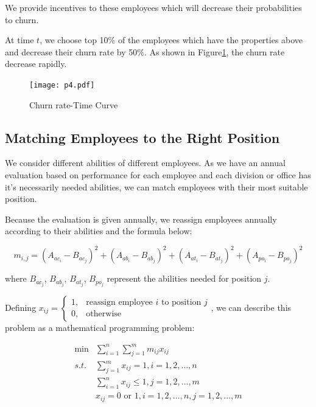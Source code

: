 \documentclass[12pt,a4paper,titlepage]{article}
\begin{document}
We provide incentives to these employees which will decrease their
probabilities to churn.

At time $t$, we choose top 10\% of the employees which have the
properties above and decrease their churn rate by 50\%. As shown in
Figure\ref{churn-rate}, the churn rate decrease rapidly.

\begin{figure}[htb]
  \centering
  \texttt{[image: p4.pdf]}
  \caption{Churn rate-Time Curve}
  \label{churn-rate}
\end{figure}

\subsection{Matching Employees to the Right Position}
\label{sec:matching-employees-to-the-right-position}

We consider different abilities of different employees. As we have an
annual evaluation based on performance for each employee and each
division or office has it's necessarily needed abilities, we can match
employees with their most suitable position.

Because the evaluation is given annually, we reassign employees
annually according to their abilities and the formula below:

\begin{equation}
m_{i,j} =
{(A_{ac_i}-B_{ac_j})}^2 + {(A_{ab_i}-B_{ab_j})}^2 + {(A_{at_i}-B_{at_j})}^2
+ {(A_{po_i}-B_{po_j})}^2
\end{equation}

where $B_{ac_j}$, $B_{ab_j}$, $B_{at_j}$, $B_{po_j}$ represent the
abilities needed for position $j$.

Defining $x_{ij}=\begin{cases} 1 , & \mbox{reassign employee } i
  \mbox{ to position } j \\ 0,&\mbox{otherwise} \end{cases}$, we can
describe this problem as a mathematical programming problem:

\begin{equation}
  \begin{split}
  \min&\sum_{i=1}^n\sum_{j=1}^m m_{ij}x_{ij} \\
  s.t.& \sum_{j=1}^m x_{ij}=1, i=1,2,\ldots,n \\
  &\sum_{i=1}^n x_{ij} \le1,j=1,2,\ldots,m \\
  &x_{ij}=0 \mbox{ or } 1,i=1,2,\ldots,n,j=1,2,\ldots,m
  \end{split}
\end{equation}
\end{document}
